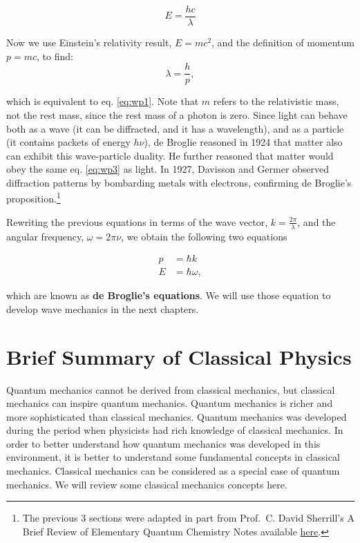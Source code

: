\documentclass[
  9pt,
]{extbook}
\theoremstyle{definition}
\theoremstyle{definition}
\theoremstyle{definition}
\theoremstyle{remark}
\begin{document}
\begin{equation}
E = \frac{h c}{\lambda}
\label{eq:wp2}
\end{equation}

Now we use Einstein's relativity result, \(E = m c^2\), and the definition of momentum \(p=mc\), to find:
\begin{equation}
\lambda = \frac{h}{p},
\label{eq:wp3}
\end{equation}

which is equivalent to eq. \eqref{eq:wp1}. Note that \(m\) refers to the relativistic mass, not the rest mass, since the rest mass of a photon is zero. Since light can behave both as a wave (it can be diffracted, and it has a wavelength), and as a particle (it contains packets of energy \(h \nu\)), de Broglie reasoned in 1924 that matter also can exhibit this wave-particle duality. He further reasoned that matter would obey the same eq. \eqref{eq:wp3} as light. In 1927, Davisson and Germer observed diffraction patterns by bombarding metals with electrons, confirming de Broglie's proposition.\footnote{The previous 3 sections were adapted in part from Prof.~C. David Sherrill's A Brief Review of Elementary Quantum Chemistry Notes available \href{http://vergil.chemistry.gatech.edu/notes/quantrev/node1.html}{here}.}

Rewriting the previous equations in terms of the wave vector, \(k=\frac{2\pi}{\lambda}\), and the angular frequency, \(\omega=2\pi\nu\), we obtain the following two equations

\begin{equation}
\begin{aligned}
p &= \hbar k \\
E &= \hbar \omega,
\end{aligned}
\label{eq:wp1b}
\end{equation}

which are known as \textbf{de Broglie's equations}. We will use those equation to develop wave mechanics in the next chapters.

\hypertarget{Classical}{%
\chapter{Brief Summary of Classical Physics}\label{Classical}}

Quantum mechanics cannot be derived from classical mechanics, but classical mechanics can inspire quantum mechanics. Quantum mechanics is richer and more sophisticated than classical mechanics. Quantum mechanics was developed during the period when physicists had rich knowledge of classical mechanics. In order to better understand how quantum mechanics was developed in this environment, it is better to understand some fundamental concepts in classical mechanics. Classical mechanics can be considered as a special case of quantum mechanics. We will review some classical mechanics concepts here.
\end{document}
